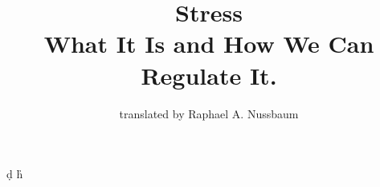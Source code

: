 \usepackage{makeidx}

\usepackage{geometry}
\usepackage{graphicx}
\usepackage{cite}
\usepackage{blindtext}     %
\usepackage{quotchap} %
\usepackage{epigraph} %
\usepackage[etex]{adjustbox}
\usepackage{wrapfig}
\usepackage[figuresright]{rotating}
\usepackage{siunitx}
\usepackage{amsthm}
\usepackage{longtable}
\DeclareSIUnit{}
\DeclareSIUnit{}


\DeclareSIUnit{}
\DeclareSIUnit{}
\DeclareSIUnit{}
\DeclareSIUnit{}
\DeclareSIUnit{}
\DeclareSIUnit{}
\DeclareSIUnit{}
\DeclareSIUnit{}

\DeclareSIUnit{}
\DeclareSIUnit\d{d}
\DeclareSIUnit\h{h}
\DeclareSIUnit{}
\DeclareSIUnit{}

\DeclareSIUnit{}
\DeclareSIUnit{}
\DeclareSIUnit{}

\usepackage{xfrac}
\usepackage{multirow}
\usepackage{tabularx}
\usepackage{array, makecell}
\usepackage{fancybox}
\usepackage{textcomp}
\usepackage{booktabs,ltablex}
\newcommand{\tabitem}{~~\llap{\textbullet}~~}
\keepXColumns

\usepackage{mwe}
\setlength{}

\usepackage{framed, multido}
\usepackage{outlines}
\usepackage[table]{xcolor}

\newcommand{\mytextbox}[2][6]{%
\begin{framed}
\noindent#2%
\multido{\i=1+1}{#1}{\newline …}
\end{framed}}

\usepackage{gensymb}
\usepackage{pict2e}
\usepackage{minitoc}
\usepackage{enumitem}

\usepackage{lscape}

\usepackage{setspace}
\raggedbottom

\newenvironment{fminipage}%
{\begin{Sbox}\begin{minipage}}%
{\end{minipage}\end{Sbox}\fbox{\TheSbox}}

\newcommand{\STAB}[1]{\begin{tabular}{@{}c@{}}#1\end{tabular}}

\usepackage{subfiles} %

\graphicspath{ {./images/} {./images/Stress/} {./images/Learning/} {./images/Emotions} {./images/Nutrition}} 


\makeindex
\author{translated by Raphael A. Nussbaum}
\title{Stress \\ What It Is and How We Can Regulate It.}

